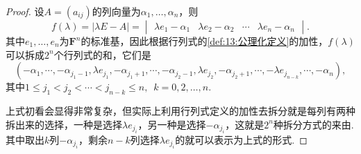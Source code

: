 \begin{proof}
    设$A=(a_{ij})$的列向量为$\alpha_1,\ldots,\alpha_n$，则
    \[f(\lambda)=|\lambda E-A|=\begin{vmatrix}
            \lambda e_1-\alpha_1 & \lambda e_2-\alpha_2 & \cdots & \lambda e_n-\alpha_n
        \end{vmatrix}.\]
    其中$e_1,\ldots,e_n$为$\mathbf{F}^n$的标准基，因此根据行列式的\autoref{def:13:公理化定义}的加性，$f(\lambda)$可以拆成$2^n$个行列式的和，它们是
    \begin{equation}\label{eq:18:特征多项式展开}
        (-\alpha_1,\cdots,-\alpha_{j_1-1},\lambda e_{j_1},-\alpha_{j_1+1},\cdots,-\alpha_{j_2-1},\lambda e_{j_2},-\alpha_{j_2+1},\cdots,-\lambda e_{j_{n-k}},\cdots,-\alpha_n),
    \end{equation}
    其中$1\leqslant j_1<j_2<\cdots<j_{n-k}\leqslant n,\enspace k=0,2,\ldots,n$.

    上式初看会显得非常复杂，但实际上利用行列式定义的加性去拆分就是每列有两种拆出来的选择，一种是选择$\lambda e_{j_i}$，另一种是选择$-\alpha_{j_i}$，这就是$2^n$种拆分方式的来由. 其中取出$k$列$-\alpha_{j_i}$，剩余$n-k$列选择$\lambda e_{j_i}$的就可以表示为上式的形式.


\end{proof}
